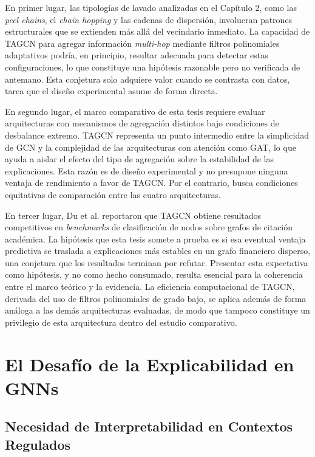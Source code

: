 En primer lugar, las tipologías de lavado analizadas en el Capítulo 2, como las \textit{peel chains}, el \textit{chain hopping} y las cadenas de dispersión, involucran patrones estructurales que se extienden más allá del vecindario inmediato. La capacidad de TAGCN para agregar información \textit{multi-hop} mediante filtros polinomiales adaptativos podría, en principio, resultar adecuada para detectar estas configuraciones, lo que constituye una hipótesis razonable pero no verificada de antemano. Esta conjetura solo adquiere valor cuando se contrasta con datos, tarea que el diseño experimental asume de forma directa.

En segundo lugar, el marco comparativo de esta tesis requiere evaluar arquitecturas con mecanismos de agregación distintos bajo condiciones de desbalance extremo. TAGCN representa un punto intermedio entre la simplicidad de GCN y la complejidad de las arquitecturas con atención como GAT, lo que ayuda a aislar el efecto del tipo de agregación sobre la estabilidad de las explicaciones. Esta razón es de diseño experimental y no presupone ninguna ventaja de rendimiento a favor de TAGCN. Por el contrario, busca condiciones equitativas de comparación entre las cuatro arquitecturas.

En tercer lugar, Du et al. reportaron que TAGCN obtiene resultados competitivos en \textit{benchmarks} de clasificación de nodos sobre grafos de citación académica. La hipótesis que esta tesis somete a prueba es si esa eventual ventaja predictiva se traslada a explicaciones más estables en un grafo financiero disperso, una conjetura que los resultados terminan por refutar. Presentar esta expectativa como hipótesis, y no como hecho consumado, resulta esencial para la coherencia entre el marco teórico y la evidencia. La eficiencia computacional de TAGCN, derivada del uso de filtros polinomiales de grado bajo, se aplica además de forma análoga a las demás arquitecturas evaluadas, de modo que tampoco constituye un privilegio de esta arquitectura dentro del estudio comparativo.



\section{El Desafío de la Explicabilidad en GNNs}

\subsection{Necesidad de Interpretabilidad en Contextos Regulados}

